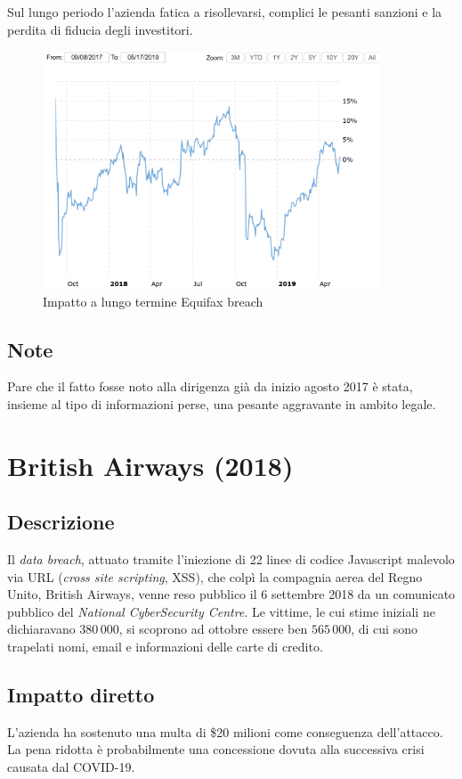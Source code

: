 \documentclass[12pt,a4paper,openright,twoside]{report}
\begin{document}
Sul lungo periodo l'azienda fatica a risollevarsi, complici le pesanti sanzioni e la perdita di fiducia degli investitori.\\

\begin{figure}[H] 
\begin{center} 
\includegraphics[width=10cm]{figures/equifax_long.png} 
\caption[Grafico Equifax long]{Impatto a lungo termine Equifax breach}\label{fig:eqx2}
\end{center}
\end{figure}

\subsection{Note}
Pare che il fatto fosse noto alla dirigenza gi\`a da inizio agosto 2017\cite{Uber_plusEquifaxAndYahoo} \`e stata, insieme al tipo di informazioni perse, una pesante aggravante in ambito legale.\\
\section{British Airways (2018)}
\subsection{Descrizione}
Il \textit{data breach}, attuato tramite l'iniezione di 22 linee di codice Javascript malevolo via URL (\textit{cross site scripting}, XSS), che colp\`i la compagnia aerea del Regno Unito, British Airways, venne reso pubblico il 6 settembre 2018 da un comunicato pubblico del \textit{National CyberSecurity Centre}. Le vittime, le cui stime iniziali ne dichiaravano $380\,000$, si scoprono ad ottobre essere ben $565\,000$, di cui sono trapelati nomi, email e informazioni delle carte di credito.\cite{BritAir} 
\subsection{Impatto diretto}
L'azienda ha sostenuto una multa di \$20 milioni come conseguenza dell'attacco. \cite{BritAir} La pena ridotta \`e probabilmente una concessione dovuta alla successiva crisi causata dal COVID-19.\\
\end{document}

